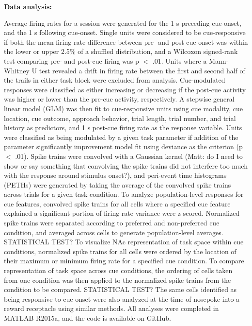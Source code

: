 \documentclass[11pt]{article}
\begin{document}
{\bf Data analysis:}

Average firing rates for a session were generated for the 1 s preceding cue-onset, and the 1 s following cue-onset. Single units were considered to be cue-responsive if both the mean firing rate difference between pre- and post-cue onset was within the lower or upper 2.5\% of a shuffled distribution, and a Wilcoxon signed-rank test comparing pre- and post-cue firing was p $<$ .01. Units where a Mann-Whitney U test revealed a drift in firing rate between the first and second half of the trails in either task block were excluded from analysis. Cue-modulated responses were classified as either increasing or decreasing if the post-cue activity was higher or lower than the pre-cue activity, respectively. A stepwise general linear model (GLM) was then fit to cue-responsive units using cue modality, cue location, cue outcome, approach behavior, trial length, trial number, and trial history as predictors, and 1 s post-cue firing rate as the response variable. Units were classified as being modulated by a given task parameter if addition of the parameter significantly improvement model fit using deviance as the criterion (p $<$ .01). Spike trains were convolved with a Gaussian kernel (Matt: do I need to show or say something that convolving the spike trains did not interfere too much with the response around stimulus onset?), and peri-event time histograms (PETHs) were generated by taking the average of the convolved spike trains across trials for a given task condition. To analyze population-level responses for cue features, convolved spike trains for all cells where a specified cue feature explained a significant portion of firing rate variance were z-scored. Normalized spike trains were separated according to preferred and non-preferred cue condition, and averaged across cells to generate population-level averages. STATISTICAL TEST? To visualize NAc representation of task space within cue conditions, normalized spike trains for all cells were ordered by the location of their maximum or minimum firing rate for a specified cue condition. To compare representation of task space across cue conditions, the ordering of cells taken from one condition was then applied to the normalized spike trains from the condition to be compared. STATISTICAL TEST? The same cells identified as being responsive to cue-onset were also analyzed at the time of nosepoke into a reward receptacle using similar methods. All analyses were completed in MATLAB R2015a, and the code is available on GitHub.
\end{document}
